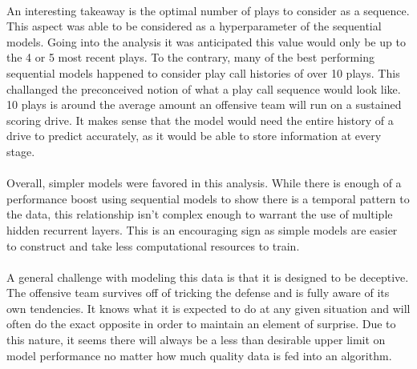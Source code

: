 \documentclass[11pt]{article}
\begin{document}
\begin{multicols*}{2}
        \paragraph{}
            An interesting takeaway is the optimal number of plays to consider as a sequence. 
            This aspect was able to be considered as a hyperparameter of the sequential models. 
            Going into the analysis it was anticipated this value would only be up to the 4 or 5 most recent plays.
            To the contrary, many of the best performing sequential models happened to consider play call histories of over 10 plays. 
            This challanged the preconceived notion of what a play call sequence would look like. 
            10 plays is around the average amount an offensive team will run on a sustained scoring drive. 
            It makes sense that the model would need the entire history of a drive to predict accurately, as it would be able to store information at every stage. 


        \vspace{-10pt}
        \paragraph{}
            Overall, simpler models were favored in this analysis.
            While there is enough of a performance boost using sequential models to show there is a temporal pattern to the data, this relationship isn't complex enough to warrant the use of multiple hidden recurrent layers.
            This is an encouraging sign as simple models are easier to construct and take less computational resources to train.
        \vspace{-10pt}
        \paragraph{}
            A general challenge with modeling this data is that it is designed to be deceptive. 
            The offensive team survives off of tricking the defense and is fully aware of its own tendencies. 
            It knows what it is expected to do at any given situation and will often do the exact opposite in order to maintain an element of surprise. 
            Due to this nature, it seems there will always be a less than desirable upper limit on model performance no matter how much quality data is fed into an algorithm.

        \vspace{-10pt}

\end{multicols*}
\end{document}
